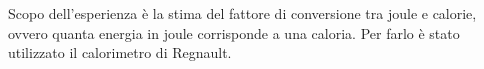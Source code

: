 Scopo dell'esperienza è la stima del fattore di conversione tra joule e calorie, ovvero quanta energia in joule corrisponde a una caloria. Per farlo è stato utilizzato il calorimetro di Regnault. 
